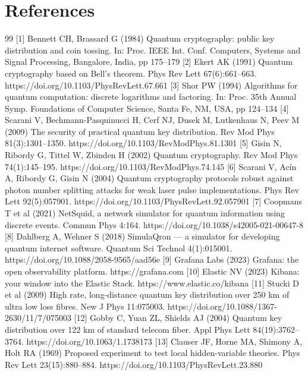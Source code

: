 {{{{{{\section{References}
\begin{thebibliography}{99}
 [1]  Bennett CH, Brassard G (1984) Quantum cryptography: public key distribution and coin tossing. In: Proc. IEEE Int. Conf. Computers, Systems and Signal Processing, Bangalore, India, pp 175–179
 [2]  Ekert AK (1991) Quantum cryptography based on Bell's theorem. Phys Rev Lett 67(6):661–663. https://doi.org/10.1103/PhysRevLett.67.661
 [3]  Shor PW (1994) Algorithms for quantum computation: discrete logarithms and factoring. In: Proc. 35th Annual Symp. Foundations of Computer Science, Santa Fe, NM, USA, pp 124–134
 [4]  Scarani V, Bechmann-Pasquinucci H, Cerf NJ, Dusek M, Lutkenhaus N, Peev M (2009) The security of practical quantum key distribution. Rev Mod Phys 81(3):1301–1350. https://doi.org/10.1103/RevModPhys.81.1301
 [5]  Gisin N, Ribordy G, Tittel W, Zbinden H (2002) Quantum cryptography. Rev Mod Phys 74(1):145–195. https://doi.org/10.1103/RevModPhys.74.145
 [6]  Scarani V, Acín A, Ribordy G, Gisin N (2004) Quantum cryptography protocols robust against photon number splitting attacks for weak laser pulse implementations. Phys Rev Lett 92(5):057901. https://doi.org/10.1103/PhysRevLett.92.057901
 [7]  Coopmans T et al (2021) NetSquid, a network simulator for quantum information using discrete events. Commun Phys 4:164. https://doi.org/10.1038/s42005-021-00647-8
 [8]  Dahlberg A, Wehner S (2018) SimulaQron — a simulator for developing quantum internet software. Quantum Sci Technol 4(1):015001. https://doi.org/10.1088/2058-9565/aad56e
 [9]  Grafana Labs (2023) Grafana: the open observability platform. https://grafana.com
 [10] Elastic NV (2023) Kibana: your window into the Elastic Stack. https://www.elastic.co/kibana
 [11] Stucki D et al (2009) High rate, long-distance quantum key distribution over 250 km of ultra low loss fibres. New J Phys 11:075003. https://doi.org/10.1088/1367-2630/11/7/075003
 [12] Gobby C, Yuan ZL, Shields AJ (2004) Quantum key distribution over 122 km of standard telecom fiber. Appl Phys Lett 84(19):3762–3764. https://doi.org/10.1063/1.1738173
 [13] Clauser JF, Horne MA, Shimony A, Holt RA (1969) Proposed experiment to test local hidden-variable theories. Phys Rev Lett 23(15):880–884. https://doi.org/10.1103/PhysRevLett.23.880

\end{thebibliography}}}}}}}
